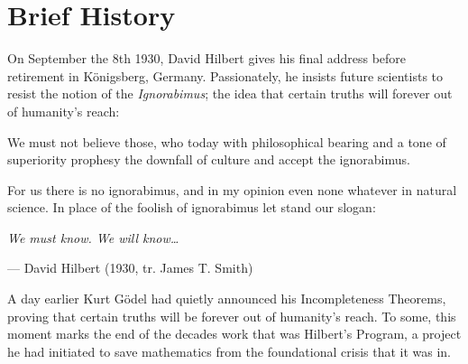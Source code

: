 \chapter{Brief History}

On September the 8th 1930, David Hilbert gives his final address before retirement in K\"onigsberg, Germany. Passionately, he insists future scientists to resist the notion of the \emph{Ignorabimus}; the idea that certain truths will forever out of humanity's reach:

\begin{displayquote}
We must not believe those, who today with philosophical bearing and a tone of superiority prophesy the downfall of culture and accept the ignorabimus. 

For us there is no ignorabimus, and in my opinion even none whatever in natural science. In place of the foolish of ignorabimus let stand our slogan:

{\centering\emph{We must know. We will know\dots}\par}
{\raggedleft --- David Hilbert (1930, tr. James T. Smith)\par}
\end{displayquote}

A day earlier Kurt G\"odel had quietly announced his Incompleteness Theorems, proving that certain truths will be forever out of humanity's reach. To some, this moment marks the end of the decades work that was Hilbert's Program, a project he had initiated to save mathematics from the foundational crisis that it was in.


